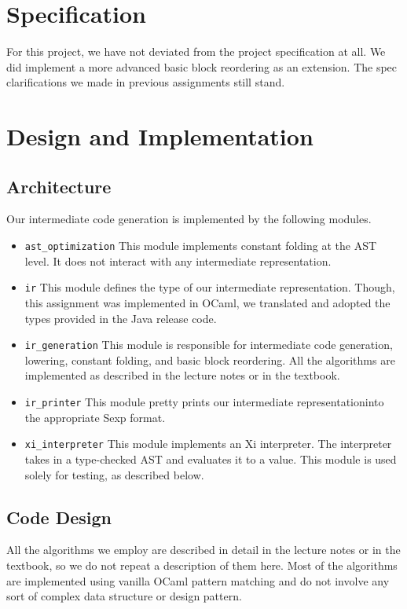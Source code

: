 \documentclass{hw}
\newcommand{\ir}{intermediate representation}
\begin{document}
\section{Specification}\label{sec:specification}
For this project, we have not deviated from the project specification at all.
We did implement a more advanced basic block reordering as an extension. The spec clarifications we made in
previous assignments still stand.

\section{Design and Implementation}\label{sec:design}
\subsection{Architecture}
Our intermediate code generation is implemented by the following modules.
\begin{itemize}
  \item \texttt{ast\_optimization}
    This module implements constant folding at the AST level. It does not
    interact with any \ir.

  \item \texttt{ir}
    This module defines the type of our \ir. Though, this assignment was
    implemented in OCaml, we translated and adopted the types provided in the
    Java release code.

  \item \texttt{ir\_generation}
    This module is responsible for intermediate code generation, lowering,
    constant folding, and basic block reordering. All the algorithms are
    implemented as described in the lecture notes or in the textbook.

  \item \texttt{ir\_printer}
    This module pretty prints our \ir into the appropriate Sexp format.

  \item \texttt{xi\_interpreter}
    This module implements an Xi interpreter. The interpreter takes in a
    type-checked AST and evaluates it to a value. This module is used solely
    for testing, as described below.
\end{itemize}

\subsection{Code Design}
All the algorithms we employ are described in detail in the lecture notes or in
the textbook, so we do not repeat a description of them here. Most of the
algorithms are implemented using vanilla OCaml pattern matching and do not
involve any sort of complex data structure or design pattern.
\end{document}
